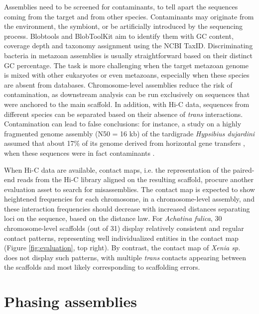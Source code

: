 Assemblies need to be screened for contaminants, to tell apart the sequences coming from the target and from other species. Contaminants may originate from the environment, the symbiont, or be artificially introduced by the sequencing process. Blobtools \cite{blobtools} and BlobToolKit \cite{blobtoolkit} aim to identify them with GC content, coverage depth and taxonomy assignment using the NCBI TaxID. Discriminating bacteria in metazoan assemblies is usually straightforward based on their distinct GC percentage. The task is more challenging when the target metazoan genome is mixed with other eukaryotes or even metazoans, especially when these species are absent from databases. Chromosome-level assemblies reduce the risk of contamination, as downstream analysis can be run exclusively on sequences that were anchored to the main scaffold. In addition, with Hi-C data, sequences from different species can be separated based on their absence of \textit{trans} interactions. Contamination can lead to false conclusions: for instance, a study on a highly fragmented genome assembly (N50 = 16 kb) of the tardigrade \textit{Hypsibius dujardini} assumed that about 17\% of its genome derived from horizontal gene transfers \cite{hypsibius_dujardini1}, when these sequences were in fact contaminants \cite{hypsibius_dujardini2}. 

When Hi-C data are available, contact maps, i.e. the representation of the paired-end reads from the Hi-C library aligned on the resulting scaffold, procure another evaluation asset to search for misassemblies. The contact map is expected to show heightened frequencies for each chromosome, in a chromosome-level assembly, and these interaction frequencies should decrease with increased distances separating loci on the sequence, based on the distance law. For \textit{Achatina fulica}, 30 chromosome-level scaffolds (out of 31) display relatively consistent and regular contact patterns, representing well individualized entities in the contact map (Figure \ref{fig:evaluation}, top right). By contrast, the contact map of \textit{Xenia sp.} does not display such patterns, with multiple \textit{trans} contacts appearing between the scaffolds and most likely corresponding to scaffolding errors. \\

\section{Phasing assemblies}

